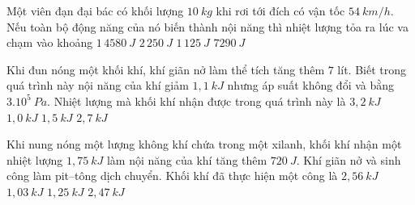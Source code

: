 \begin{ex}
	Một viên đạn đại bác có khối lượng $10\ kg$ khi rơi tới đích có vận tốc $54\ km/h$. Nếu toàn bộ động năng của nó biến thành nội năng thì nhiệt lượng tỏa ra lúc va chạm vào khoảng
	\choice 
	{$1\,4580\ J$}
	{$2\,250\ J$}
	{\True $1\,125\ J$}
	{$7290\ J$}
\end{ex}

\begin{ex}
	 Khi đun nóng một khối khí, khí giãn nở làm thể tích tăng thêm $7$ lít. Biết trong quá trình này nội năng của khí giảm $1,1\ kJ$ nhưng áp suất không đổi và bằng $3.10^5\ Pa$. Nhiệt lượng mà khối khí nhận được trong quá trình này là
	 \choice 
	 {$3,2\ kJ$}
	 {\True $1,0\ kJ$}
	 {$1,5\ kJ$}
	 {$2,7\ kJ$}
\end{ex}

\begin{ex}
		 Khi nung nóng một lượng không khí chứa trong một xilanh, khối khí nhận một nhiệt lượng $1,75 \ kJ$ làm nội năng của khí tăng thêm $720 \ J$. Khí giãn nở và sinh công làm pit–tông dịch chuyển. Khối khí đã thực hiện một công là
		 \choice 
		 {$2,56\ kJ$}
		 {\True $1,03\ kJ$}
		 {$1,25\ kJ$}
		 {$2,47\ kJ$}
		\end{ex}

